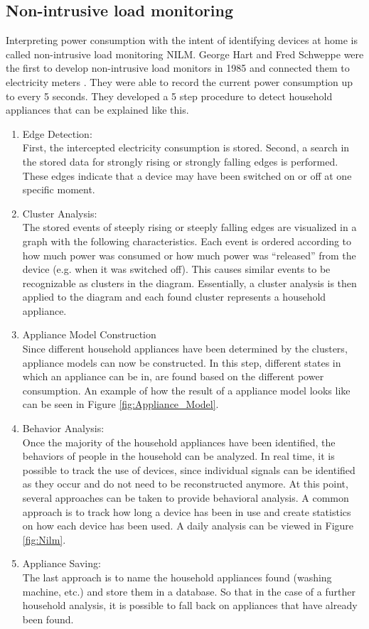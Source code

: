 \subsection{Non-intrusive load monitoring} 
\label{subsec:NILM_sec}
Interpreting power consumption with the intent of identifying devices at home is called non-intrusive load monitoring \gls{NILM}. George Hart and Fred Schweppe were the first to develop non-intrusive load monitors in 1985 and connected them to electricity meters \cite{hart1989residential}. They were able to record the current power consumption up to every 5 seconds. They developed a 5 step procedure to detect household appliances that can be explained like this.
\begin{enumerate}
\item Edge Detection:\\
First, the intercepted electricity consumption is stored. Second, a search in the stored data for strongly rising or strongly falling edges is performed. These edges indicate that a device may have been switched on or off at one specific moment.
\item Cluster Analysis:\\ 
The stored events of steeply rising or steeply falling edges are visualized in a graph with the following characteristics. Each event is ordered according to how much power was consumed or how much power was 	``released'' from the device (e.g. when it was switched off). This causes similar events to be recognizable as clusters in the diagram.
Essentially, a cluster analysis is then applied to the diagram and each found cluster represents a household appliance.
\item Appliance Model Construction\\
Since different household appliances have been determined by the clusters, appliance models can now be constructed. In this step, different states in which an appliance can be in, are found based on the different power consumption. An example of how the result of a appliance model looks like can be seen in Figure \ref{fig:Appliance_Model}.
\item Behavior Analysis:\\
Once the majority of the household appliances have been identified, the behaviors of people in the household can be analyzed. In real time, it is possible to track the use of devices, since individual signals can be identified as they occur and do not need to be reconstructed anymore.
At this point, several approaches can be taken to provide behavioral analysis. A common approach is to track how long a device has been in use and create statistics on how each device has been used. A daily analysis can be viewed in Figure \ref{fig:Nilm}.
\item Appliance Saving:\\
The last approach is to name the household appliances found (washing machine, etc.) and store them in a database. So that in the case of a further household analysis, it is possible to fall back on appliances that have already been found.
\end{enumerate}
